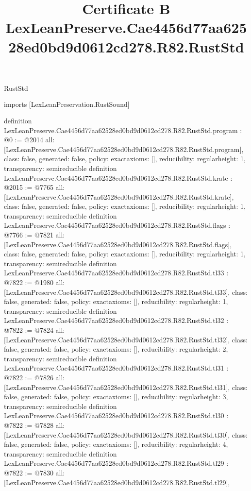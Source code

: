 \begin{lexlean}{RustStd}
\title{Certificate B LexLeanPreserve.Cae4456d77aa62528ed0bd9d0612cd278.R82.RustStd}
\begin{coremodule}
imports [LexLeanPreservation.RustSound]

definition LexLeanPreserve.Cae4456d77aa62528ed0bd9d0612cd278.R82.RustStd.program : @0 := @2014 {
  all: [LexLeanPreserve.Cae4456d77aa62528ed0bd9d0612cd278.R82.RustStd.program],
  class: false,
  generated: false,
  policy: exact{axioms: []},
  reducibility: regular{height: 1},
  transparency: semireducible
}
definition LexLeanPreserve.Cae4456d77aa62528ed0bd9d0612cd278.R82.RustStd.krate : @2015 := @7765 {
  all: [LexLeanPreserve.Cae4456d77aa62528ed0bd9d0612cd278.R82.RustStd.krate],
  class: false,
  generated: false,
  policy: exact{axioms: []},
  reducibility: regular{height: 1},
  transparency: semireducible
}
definition LexLeanPreserve.Cae4456d77aa62528ed0bd9d0612cd278.R82.RustStd.flags : @7766 := @7821 {
  all: [LexLeanPreserve.Cae4456d77aa62528ed0bd9d0612cd278.R82.RustStd.flags],
  class: false,
  generated: false,
  policy: exact{axioms: []},
  reducibility: regular{height: 1},
  transparency: semireducible
}
definition LexLeanPreserve.Cae4456d77aa62528ed0bd9d0612cd278.R82.RustStd.tl33 : @7822 := @1980 {
  all: [LexLeanPreserve.Cae4456d77aa62528ed0bd9d0612cd278.R82.RustStd.tl33],
  class: false,
  generated: false,
  policy: exact{axioms: []},
  reducibility: regular{height: 1},
  transparency: semireducible
}
definition LexLeanPreserve.Cae4456d77aa62528ed0bd9d0612cd278.R82.RustStd.tl32 : @7822 := @7824 {
  all: [LexLeanPreserve.Cae4456d77aa62528ed0bd9d0612cd278.R82.RustStd.tl32],
  class: false,
  generated: false,
  policy: exact{axioms: []},
  reducibility: regular{height: 2},
  transparency: semireducible
}
definition LexLeanPreserve.Cae4456d77aa62528ed0bd9d0612cd278.R82.RustStd.tl31 : @7822 := @7826 {
  all: [LexLeanPreserve.Cae4456d77aa62528ed0bd9d0612cd278.R82.RustStd.tl31],
  class: false,
  generated: false,
  policy: exact{axioms: []},
  reducibility: regular{height: 3},
  transparency: semireducible
}
definition LexLeanPreserve.Cae4456d77aa62528ed0bd9d0612cd278.R82.RustStd.tl30 : @7822 := @7828 {
  all: [LexLeanPreserve.Cae4456d77aa62528ed0bd9d0612cd278.R82.RustStd.tl30],
  class: false,
  generated: false,
  policy: exact{axioms: []},
  reducibility: regular{height: 4},
  transparency: semireducible
}
definition LexLeanPreserve.Cae4456d77aa62528ed0bd9d0612cd278.R82.RustStd.tl29 : @7822 := @7830 {
  all: [LexLeanPreserve.Cae4456d77aa62528ed0bd9d0612cd278.R82.RustStd.tl29],
}
\end{coremodule}
\end{lexlean}
